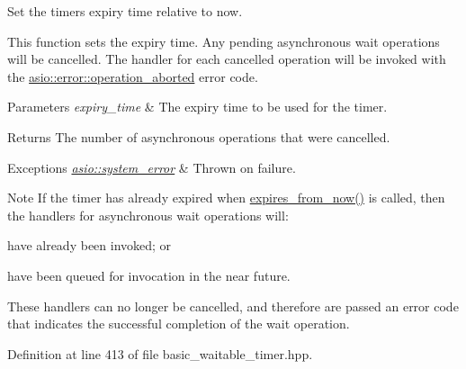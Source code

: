 Set the timer\textquotesingle{}s expiry time relative to now. 

This function sets the expiry time. Any pending asynchronous wait operations will be cancelled. The handler for each cancelled operation will be invoked with the \hyperlink{namespaceasio_1_1error_a2a69445eee784059ac2f4a6c4f5fe90dacde6760763051561f6c2ffc4ddf2be1b}{asio\+::error\+::operation\+\_\+aborted} error code.


\begin{DoxyParams}{Parameters}
{\em expiry\+\_\+time} & The expiry time to be used for the timer.\\
\hline
\end{DoxyParams}
\begin{DoxyReturn}{Returns}
The number of asynchronous operations that were cancelled.
\end{DoxyReturn}

\begin{DoxyExceptions}{Exceptions}
{\em \hyperlink{classasio_1_1system__error}{asio\+::system\+\_\+error}} & Thrown on failure.\\
\hline
\end{DoxyExceptions}
\begin{DoxyNote}{Note}
If the timer has already expired when \hyperlink{classasio_1_1basic__waitable__timer_afc1cfc8ac6584ae28d69f790a8fe0e73}{expires\+\_\+from\+\_\+now()} is called, then the handlers for asynchronous wait operations will\+:
\end{DoxyNote}
\begin{DoxyItemize}
\item have already been invoked; or\end{DoxyItemize}
\begin{DoxyItemize}
\item have been queued for invocation in the near future.\end{DoxyItemize}
These handlers can no longer be cancelled, and therefore are passed an error code that indicates the successful completion of the wait operation. 

Definition at line 413 of file basic\+\_\+waitable\+\_\+timer.\+hpp.

\hypertarget{classasio_1_1basic__waitable__timer_af456a9a924c173765a9e52bea96b7765}{}
